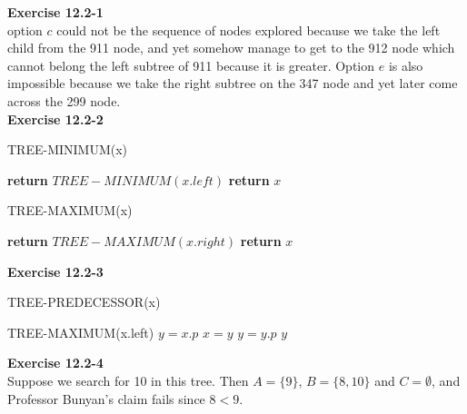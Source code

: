 \documentclass{article}
\begin{document}
\noindent\textbf{ Exercise 12.2-1} \\

option $c$ could not be the sequence of nodes explored because we take the left child from the 911 node, and yet somehow manage to get to the 912 node which cannot belong the left subtree of 911 because it is greater. Option $e$ is also impossible because we take the right subtree on the 347 node and yet later come across the 299 node.\\

\noindent\textbf{Exercise 12.2-2}\\

\begin{algorithm}
\caption{TREE-MINIMUM(x)}
\begin{algorithmic}
	\State \textbf{return} $TREE-MINIMUM(x.left)$
\Else
\State \textbf{return} $x$
\EndIf
\end{algorithmic}
\end{algorithm}

\begin{algorithm}
\caption{TREE-MAXIMUM(x)}
\begin{algorithmic}
	\State \textbf{return} $TREE-MAXIMUM(x.right)$
\Else
\State \textbf{return} $x$
\EndIf
\end{algorithmic}
\end{algorithm}

\noindent\textbf{ Exercise 12.2-3} \\

\begin{algorithm}
\caption{TREE-PREDECESSOR(x)}
\begin{algorithmic}
\State \Return TREE-MAXIMUM(x.left)
\EndIf
\State $y = x.p$
\State $x=y$
\State $y=  y.p$
\EndWhile
\State\Return $y$
\end{algorithmic}
\end{algorithm}

\noindent\textbf{Exercise 12.2-4}\\

Suppose we search for 10 in this tree.  Then $A = \{9\}$, $B = \{8,10\}$ and $C = \emptyset$, and Professor Bunyan's claim fails since $8 < 9$.

\end{document}
